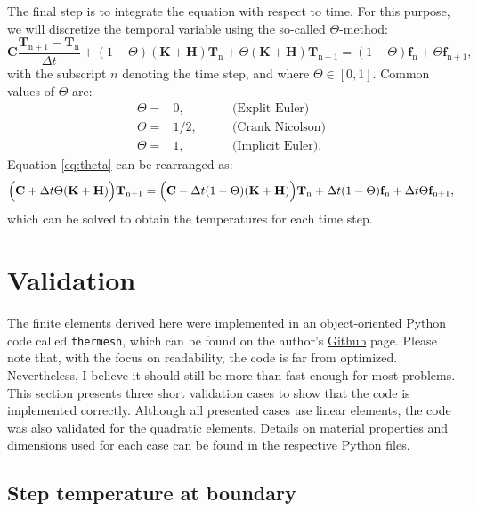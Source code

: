 \documentclass[10pt, a4paper, twoside, headinclude,footinclude, BCOR5mm]{scrartcl}
\begin{document}
The final step is to integrate the equation with respect to time. For this purpose, we will discretize the temporal variable using the so-called \(\Theta\)-method:
\begin{equation}
  \mathbf{C} \frac{\mathbf{T}_{\text{n}+1} - \mathbf{T}_\text{n}}{\Delta t} +
  (1-\Theta)(\mathbf{K}+\mathbf{H}) \mathbf{T}_{\text{n}} +
  \Theta(\mathbf{K}+\mathbf{H}) \mathbf{T}_{\text{n}+1}
  =
  (1-\Theta)\mathbf{f}_{\text{n}} + \Theta\mathbf{f}_{\text{n}+1},
  \label{eq:theta}
\end{equation}
with the subscript \(n\) denoting the time step, and where \(\Theta \in [0, 1]\). Common values of \(\Theta\) are:
\begin{eqnarray*}
  \Theta =& 0,   &\qquad\text{(Explit Euler)}\\
  \Theta =& 1/2, &\qquad\text{(Crank Nicolson)}\\
  \Theta =& 1,   &\qquad\text{(Implicit Euler)}.
\end{eqnarray*}
Equation \ref{eq:theta} can be rearranged as:
\begin{equation*}
  \Bigl( \mathbf{C} + \Delta t\Theta(\mathbf{K}+\mathbf{H})
  \Bigr) \mathbf{T}_{\text{n}+1} =
  \Bigl(
  \mathbf{C} - \Delta t(1-\Theta)(\mathbf{K}+\mathbf{H})
  \Bigr) \mathbf{T}_{\text{n}} +
  \Delta t(1-\Theta)\mathbf{f}_{\text{n}} +
  \Delta t\Theta\mathbf{f}_{\text{n}+1},
\end{equation*}
which can be solved to obtain the temperatures for each time step.

\section{Validation}
\label{sec:org50b76d1}

The finite elements derived here were  implemented in an object-oriented Python code called \texttt{thermesh}, which can be found on the author's \href{https://github.com/wjbg}{Github} page. Please note that, with the focus on readability, the code is far from optimized. Nevertheless, I believe it should still be more than fast enough for most problems. This section presents three short validation cases to show that the code is implemented correctly. Although all presented cases use linear elements, the code was also validated for the quadratic elements. Details on material properties and dimensions used for each case can be found in the respective Python files.

\subsection{Step temperature at boundary}
\label{sec:org14984d2}
\end{document}
